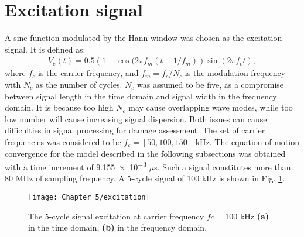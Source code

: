 \section{Excitation signal}
\label{sec:excitation}

A sine function modulated by the Hann window was chosen as the excitation signal.
It is defined as:
\begin{eqnarray}
	V_e(t) = 0.5\left(1-\cos(2\pi f_m(t-1/f_m)\right)\sin(2\pi f_ct),
\end{eqnarray}
%
%
%
where \(f_c\) is the carrier frequency, and \(f_m=f_c/N_c\) is the modulation frequency with \(N_c\) as the number of cycles.
\(N_c\) was assumed to be five, as a compromise between signal length in the time domain and signal width in the frequency domain.
It is because too high \(N_c\) may cause overlapping wave modes, while too low number will cause increasing signal dispersion.
Both issues can cause difficulties in signal processing for damage assessment.
The set of carrier frequencies was considered to be \(f_c=[50, 100, 150] \) \unit{\kHz}.
The equation of motion convergence for the model described in the following subsections was obtained with a time increment of \num{9.155e-3} \(\mu\)s.
Such a signal constitutes more than 80 \unit{\MHz} of sampling frequency.
A 5-cycle signal of 100 \unit{\kHz} is shown in Fig. \ref{fig:signal_100kHz}.
\begin{figure}[H]
	\begin{center}
		\texttt{[image: Chapter\_5/excitation]}
	\end{center}
	\caption{The 5-cycle signal excitation at carrier frequency \(fc=100\) \unit{\kHz} \textbf{(a)} in the time domain, \textbf{(b)} in the frequency domain.}
	\label{fig:signal_100kHz}
\end{figure}
